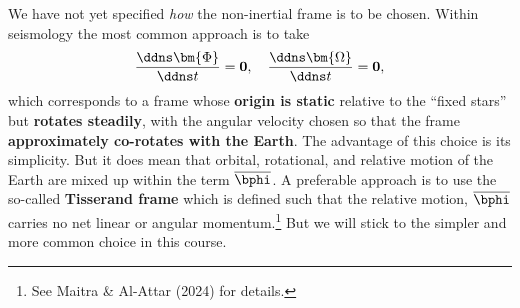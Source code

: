 We have not yet specified \emph{how} the non-inertial frame is to be chosen. Within seismology the most common 
approach is to take
\begin{equation}
\frac{\ddns \bm{\Phi}}{\ddns t}=\mathbf{0},\quad \frac{\ddns \bm{\Omega}}{\ddns t}=\mathbf{0},
\label{eq:35}
\end{equation}
which corresponds to a frame whose \textbf{origin is static} relative to the ``fixed stars'' but \textbf{rotates steadily}, 
with the angular velocity chosen so that the frame \textbf{approximately co-rotates with the Earth}. The advantage of this 
choice is its simplicity. But it does mean that orbital, rotational, and relative motion of the Earth are mixed 
up within the term $\overline{\bphi}$. A preferable approach is to use the so-called 
\textbf{Tisserand frame} which is defined such that the relative motion, $\overline{\bphi}$ carries no net linear
 or angular momentum.\footnote{See Maitra \& Al-Attar (2024) for details.}
But we will stick to the simpler and more common choice in this course. 

